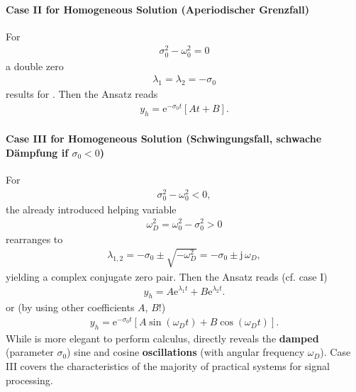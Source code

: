 \documentclass[11pt,a4paper,DIV=12]{scrartcl}
\begin{document}
\paragraph{Case II for Homogeneous Solution (Aperiodischer Grenzfall)}
For
\begin{align}
\sigma_0^2 - \omega_0^2 = 0
\end{align}
a double zero
\begin{align}
\lambda_{1} = \lambda_{2} = -\sigma_0
\end{align}
results for .
Then the Ansatz reads
\begin{align}
y_h = \mathrm{e}^{-\sigma_0 t} [A t + B].
\end{align}

\paragraph{Case III for Homogeneous Solution (Schwingungsfall,
schwache Dämpfung if $\sigma_0<0$)}
\label{pg:caseIII}
For
\begin{align}
\sigma_0^2 - \omega_0^2 < 0,
\end{align}
the already introduced helping variable
\begin{align}
\omega_D^2 = \omega_0^2 - \sigma_0^2 > 0
\end{align}
rearranges  to
\begin{align}
\label{eq:lmb12_caseIII}
\lambda_{1,2} = -\sigma_0 \pm \sqrt{-\omega_D^2}
= -\sigma_0 \pm \mathrm{j}\,\omega_D,
\end{align}
yielding a complex conjugate zero pair.
Then the Ansatz reads (cf. case I)
\begin{align}
\label{eq:Ansatz_caseIIIkomplex}
\boxed{
y_h = A \mathrm{e}^{\lambda_1 t} + B \mathrm{e}^{\lambda_2 t}.
}
\end{align}
or (by using other coefficients $A$, $B$!)
\begin{align}
\label{eq:Ansatz_caseIIIsincos}
y_h = \mathrm{e}^{-\sigma_0 t}
\left[ A \sin(\omega_D t) + B \cos(\omega_D t)\right].
\end{align}
While  is more elegant to perform calculus,
 directly reveals the \textbf{damped}
(parameter $\sigma_0$) sine and cosine \textbf{oscillations}
(with angular frequency $\omega_D$).
%
Case III covers the characteristics of the majority of practical systems
for signal processing.



\end{document}
